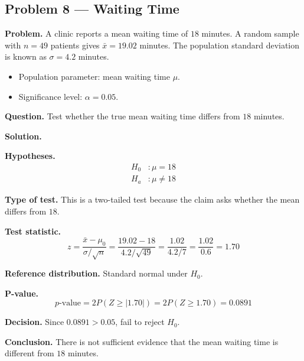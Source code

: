 \begin{ExamProblems}
\hypertarget{c5-ex8}{}
\item
\subsection*{Problem 8 — Waiting Time}

\textbf{Problem.} A clinic reports a mean waiting time of \(18\) minutes. A random sample with \(n=49\) patients gives \(\bar{x}=19.02\) minutes. The population standard deviation is known as \(\sigma=4.2\) minutes.
\begin{itemize}
    \item Population parameter: mean waiting time \(\mu\).
    \item Significance level: \(\alpha=0.05\).
\end{itemize}

\textbf{Question.} Test whether the true mean waiting time differs from \(18\) minutes.

\textbf{Solution.}

\textbf{Hypotheses.}
\[
\begin{aligned}
H_0&: \mu = 18 \\
H_a&: \mu \ne 18
\end{aligned}
\]

\textbf{Type of test.} This is a two-tailed test because the claim asks whether the mean differs from \(18\).

\textbf{Test statistic.}
\[
z = \frac{\bar{x}-\mu_0}{\sigma/\sqrt{n}} = \frac{19.02-18}{4.2/\sqrt{49}} = \frac{1.02}{4.2/7} = \frac{1.02}{0.6} = 1.70
\]

\textbf{Reference distribution.} Standard normal under \(H_0\).

\textbf{P-value.}
\[
p\text{-value}=2P(Z\ge |1.70|)=2P(Z\ge 1.70)=0.0891
\]

\textbf{Decision.} Since \(0.0891>0.05\), fail to reject \(H_0\).

\textbf{Conclusion.} There is not sufficient evidence that the mean waiting time is different from \(18\) minutes.

\end{ExamProblems}

